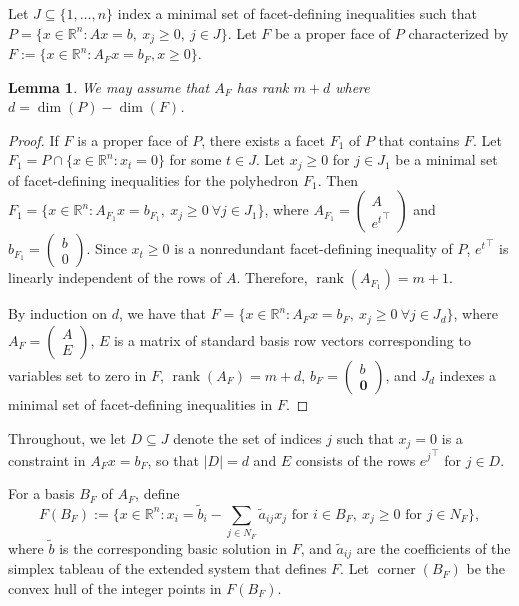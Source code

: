 \documentclass{article}
\newtheorem{lemma}{Lemma}
\newcommand{\R}{\mathbb{R}}
\begin{document}
Let $J \subseteq \{1, \ldots, n\}$ index a minimal set of facet-defining inequalities such that $P = \{x \in \R^n: Ax = b, \ x_j \geq 0, \ j \in J \}$. Let $F$ be a proper face of $P$ characterized by $F := \{x \in \R^n: A_Fx = b_F, x \geq 0\}$.
\begin{lemma} \label{lemma:A_F-rank}
    We may assume that $A_F$ has rank $m+d$ where $d = \operatorname{dim}(P) - \operatorname{dim}(F)$.
\end{lemma}
\begin{proof}
    If $F$ is a proper face of $P$, there exists a facet $F_1$ of $P$ that contains $F$. Let $F_1 = P \cap \{x \in \R^n : x_t=0\}$ for some $t \in J$. Let $x_j \geq 0$ for $j \in J_1$ be a minimal set of facet-defining inequalities for the polyhedron $F_1$. Then $F_1 = \{x \in \R^n: A_{F_1}x=b_{F_1}, \ x_j \geq 0 \ \forall j \in J_1\}$, where $A_{F_1} = \begin{pmatrix}A \\ {e^t}^\top\end{pmatrix}$ and $b_{F_1} = \begin{pmatrix}b \\ 0\end{pmatrix}$. Since $x_t \geq 0$ is a nonredundant facet-defining inequality of $P$, ${e^t}^\top$ is linearly independent of the rows of $A$. Therefore, $\operatorname{rank}(A_{F_1}) = m+1$.

    By induction on $d$, we have that $F = \{x \in \R^n: A_{F}x=b_{F}, \ x_j \geq 0 \ \forall j \in J_d\}$, where $A_F = \begin{pmatrix}A \\ E\end{pmatrix}$, $E$ is a matrix of standard basis row vectors corresponding to variables set to zero in $F$, $\operatorname{rank}(A_F) = m+d$, $b_F = \begin{pmatrix}b \\ \mathbf{0}\end{pmatrix}$,  and $J_d$ indexes a minimal set of facet-defining inequalities in $F$.
\end{proof}

Throughout, we let $D \subseteq J$ denote the set of indices $j$ such that $x_j = 0$ is a constraint in $A_F x = b_F$, so that $|D| = d$ and $E$ consists of the rows ${e^j}^\top$ for $j \in D$.

For a basis $B_F$ of $A_F$, define
$$F(B_F) := \{x \in \R^n: x_i = \tilde{b}_i - \sum_{j \in N_F} \tilde{a}_{ij} x_j \text{ for } i \in B_F, \ x_j \geq 0 \text{ for } j \in N_F\},$$
where $\tilde b$ is the corresponding basic solution in $F$, and $\tilde a_{ij}$ are the coefficients of the simplex tableau of the extended system that defines $F$. Let $\operatorname{corner}(B_F)$ be the convex hull of the integer points in $F(B_F)$.
\end{document}

